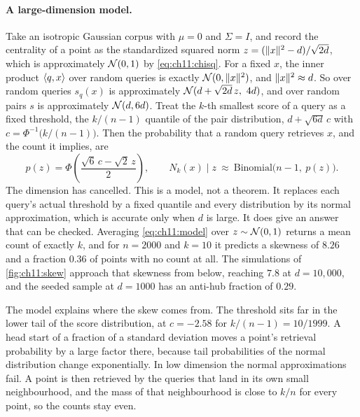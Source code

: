 \paragraph{A large-dimension model.} Take an isotropic Gaussian corpus with $\mu=0$ and $\Sigma=I$, and record the centrality of a point as the standardized squared norm $z=(\lVert x\rVert^2-d)/\sqrt{2d}$, which is approximately $\mathcal{N}(0,1)$ by \cref{eq:ch11:chisq}. For a fixed $x$, the inner product $\langle q,x\rangle$ over random queries is exactly $\mathcal{N}(0,\lVert x\rVert^2)$, and $\lVert x\rVert^2\approx d$. So over random queries $s_q(x)$ is approximately $\Normal(d+\sqrt{2d}\,z,\ 4d)$, and over random pairs $s$ is approximately $\mathcal{N}(d,6d)$. Treat the $k$-th smallest score of a query as a fixed threshold, the $k/(n-1)$ quantile of the pair distribution, $d+\sqrt{6d}\,c$ with $c=\Phi^{-1}\big(k/(n-1)\big)$. Then the probability that a random query retrieves $x$, and the count it implies, are
\begin{equation}\label{eq:ch11:model}
p(z)=\Phi\!\left(\frac{\sqrt6\,c-\sqrt2\,z}{2}\right),\qquad
N_k(x)\mid z\ \approx\ \mathrm{Binomial}\big(n-1,\ p(z)\big).
\end{equation}
The dimension has cancelled. This is a model, not a theorem. It replaces each query's actual threshold by a fixed quantile and every distribution by its normal approximation, which is accurate only when $d$ is large. It does give an answer that can be checked. Averaging \cref{eq:ch11:model} over $z\sim\mathcal{N}(0,1)$ returns a mean count of exactly $k$, and for $n=2000$ and $k=10$ it predicts a skewness of $8.26$ and a fraction $0.36$ of points with no count at all. The simulations of \cref{fig:ch11:skew} approach that skewness from below, reaching $7.8$ at $d=10{,}000$, and the seeded sample at $d=1000$ has an anti-hub fraction of $0.29$.

The model explains where the skew comes from. The threshold sits far in the lower tail of the score distribution, at $c=-2.58$ for $k/(n-1)=10/1999$. A head start of a fraction of a standard deviation moves a point's retrieval probability by a large factor there, because tail probabilities of the normal distribution change exponentially. In low dimension the normal approximations fail. A point is then retrieved by the queries that land in its own small neighbourhood, and the mass of that neighbourhood is close to $k/n$ for every point, so the counts stay even.

